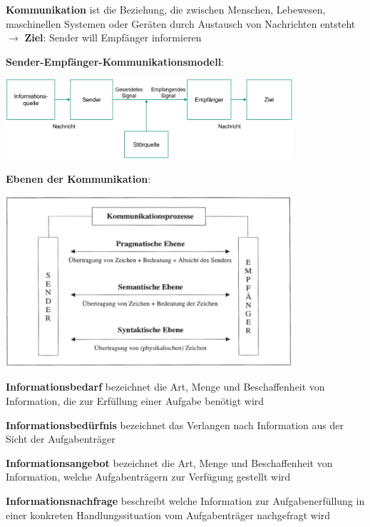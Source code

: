 \textbf{Kommunikation} ist die Beziehung, die zwischen Menschen, Lebewesen, maschinellen Systemen oder Geräten durch Austausch von Nachrichten entsteht $\rightarrow$ \textbf{Ziel}: Sender will Empfänger informieren

\textbf{Sender-Empfänger-Kommunikationsmodell}:
\begin{center}
	\includegraphics[width=0.8\textwidth]{images/sue-modell.png}
\end{center}

\textbf{Ebenen der Kommunikation}:
\begin{center}
	\includegraphics[width=0.8\textwidth]{images/ebenen.png}
\end{center}

\textbf{Informationsbedarf} bezeichnet die Art, Menge und Beschaffenheit von Information, die zur Erfüllung einer Aufgabe benötigt wird

\textbf{Informationsbedürfnis} bezeichnet das Verlangen nach Information aus der Sicht der Aufgabenträger

\textbf{Informationsangebot} bezeichnet die Art, Menge und Beschaffenheit von Information, welche Aufgabenträgern zur Verfügung gestellt wird

\textbf{Informationsnachfrage} beschreibt welche Information zur Aufgabenerfüllung in einer konkreten Handlungssituation vom Aufgabenträger nachgefragt wird

